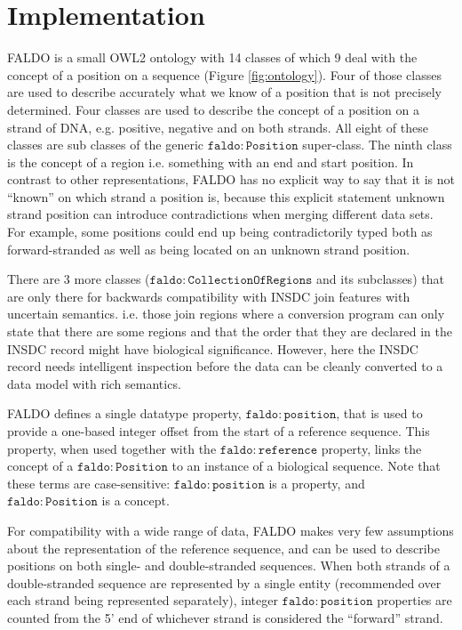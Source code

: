 \section*{Implementation}

FALDO is a small OWL2 ontology with 14 classes of which 9 deal with the concept of a position on a sequence (Figure \ref{fig:ontology}).
Four of those classes are used to describe accurately what we know of a position that is not precisely determined.
Four classes are used to describe the concept of a position on a strand of DNA, e.g. positive, negative and on both strands.
All eight of these classes are sub classes of the generic $\mathtt{faldo\colon{}Position}$ super-class.
The ninth class is the concept of a region i.e. something with an end and start position.
In contrast to other representations, FALDO has no explicit way to say that it is not ``known'' on which strand a position is, because this explicit statement unknown strand position can introduce contradictions when merging different data sets.
For example, some positions could end up being contradictorily typed both as forward-stranded as well as being located on an unknown strand position.

There are 3 more classes ($\mathtt{faldo\colon{}CollectionOfRegions}$ and its subclasses) that are only there for backwards compatibility with INSDC join features with uncertain semantics. i.e. those join regions where a conversion program can only state that there are some regions and that the order that they are declared in the INSDC record might have biological significance.
However, here the INSDC record needs intelligent inspection before the data can be cleanly converted to a data model with rich semantics.

FALDO defines a single datatype property,
$\mathtt{faldo\colon{}position}$, that is used to provide a one-based
integer offset from the start of a reference sequence.
This property, when used together with the
$\mathtt{faldo\colon{}reference}$ property, links the concept of
a $\mathtt{faldo\colon{}Position}$ to an instance of a biological
sequence.
Note that these terms are case-sensitive:
$\mathtt{faldo\colon{}position}$ is a property, and
$\mathtt{faldo\colon{}Position}$ is a concept.

For compatibility with a wide range of data, FALDO makes very few
assumptions about the representation of the reference sequence, and
can be used to describe positions on both single- and double-stranded
sequences.
When both strands of a double-stranded sequence are represented by a
single entity (recommended over each strand being represented
separately), integer $\mathtt{faldo\colon{}position}$ properties are
counted from the 5' end of whichever strand is considered the
``forward'' strand.

